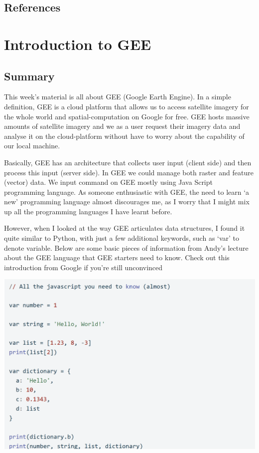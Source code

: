 \documentclass[
  letterpaper,
  DIV=11,
  numbers=noendperiod]{scrreprt}
\begin{document}
\hypertarget{references-1}{%
\section{References}\label{references-1}}


\hypertarget{introduction-to-gee}{%
\chapter{Introduction to GEE}\label{introduction-to-gee}}

\hypertarget{summary-4}{%
\section{Summary}\label{summary-4}}

This week's material is all about GEE (Google Earth Engine). In a simple
definition, GEE is a cloud platform that allows us to access satellite
imagery for the whole world and spatial-computation on Google for free.
GEE hosts massive amounts of satellite imagery and we as a user request
their imagery data and analyse it on the cloud-platform without have to
worry about the capability of our local machine.

Basically, GEE has an architecture that collects user input (client
side) and then process this input (server side). In GEE we could manage
both raster and feature (vector) data. We input command on GEE mostly
using Java Script programming language. As someone enthusiastic with
GEE, the need to learn `a new' programming language almost discourages
me, as I worry that I might mix up all the programming languages I have
learnt before.

However, when I looked at the way GEE articulates data structures, I
found it quite similar to Python, with just a few additional keywords,
such as `var' to denote variable. Below are some basic pieces of
information from Andy's lecture about the GEE language that GEE starters
need to know. Check out this introduction from Google if you're still
unconvinced

\includegraphics[width=5.29167in,height=\textheight]{images/clipboard-203956171.png}
\end{document}
